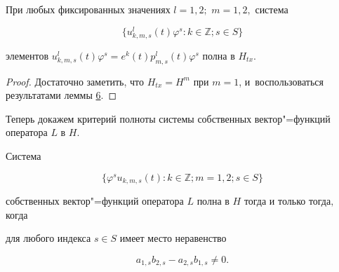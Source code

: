 \smallskip



\hypertarget{korn:lemma:10}{}



\begin{lemma}[10]При любых фиксированных значениях $l=1,2;$ $m =1,2,$ система

\begin{equation}

\label{kor:eq2.16}

\{u_{k,m,s}^l(t)\varphi^s: k\in\mathbb{Z}; s\in S\}

\end{equation}

элементов $u_{k,m,s}^l(t)\varphi^s=e^k(t)p_{m,s}^l(t)\varphi^s$ полна в $H_{tx}.$

\end{lemma}



\smallskip



\begin{proof} Достаточно заметить, что $H_{tx}=H^m$ при $m=1$, и~воспользоваться результатами леммы \hyperlink{korn:lemma:6}{6}.

 \end{proof}



Теперь докажем критерий полноты системы собственных вектор"=функций оператора $L$ в $H$.



\smallskip



\hypertarget{korn:lemma:11}{}





\begin{lemma}[11]Система

\begin{equation}

\label{kor:eq2.17}

\{\varphi^su_{k,m,s}(t):k\in\mathbb{Z};m=1,2;s\in S\}

\end{equation}

собственных вектор"=функций оператора $L$ полна в $H$ тогда и только тогда$,$ когда 

для любого индекса $s\in S$ имеет место неравенство

\begin{equation}

\label{kor:eq2.18}

a_{1,s}b_{2,s}-a_{2,s}b_{1,s}\ne0.

\end{equation}

\end{lemma}



